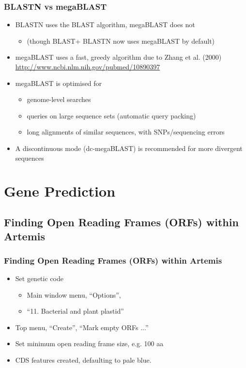 \documentclass[table]{beamer}
\begin{document}
  \begin{frame}
    \frametitle{BLASTN vs megaBLAST}
    \begin{itemize}
      \item<1-> BLASTN uses the BLAST algorithm, megaBLAST does not
      \begin{itemize}
        \item (though BLAST+ BLASTN now uses megaBLAST by default)
      \end{itemize}      
      \item<1-> megaBLAST uses a fast, greedy algorithm due to Zhang et al. (2000) \url{http://www.ncbi.nlm.nih.gov/pubmed/10890397}
      \item<2-> megaBLAST is optimised for
      \begin{itemize}
        \item genome-level searches
        \item queries on large sequence sets (automatic query packing)
        \item long alignments of similar sequences, with SNPs/sequencing errors
      \end{itemize}
      \item<2-> A discontinuous mode (dc-megaBLAST) is recommended for more divergent sequences
    \end{itemize}
\end{frame}


\section{Gene Prediction}
\subsection{Finding Open Reading Frames (ORFs) within Artemis}

\begin{frame}
    \frametitle{Finding Open Reading Frames (ORFs) within Artemis}
    \begin{itemize}
      \item<1-> Set genetic code
      \begin{itemize}
        \item Main window menu, ``Options'',
        \item ``11. Bacterial and plant plastid''
      \end{itemize}
      \item<2-> Top menu, ``Create'', ``Mark empty ORFs ...''
      \item<2-> Set minimum open reading frame size, e.g. 100 aa
      \item<2-> CDS features created, defaulting to pale blue.
    \end{itemize}
\end{frame}
\end{document}
